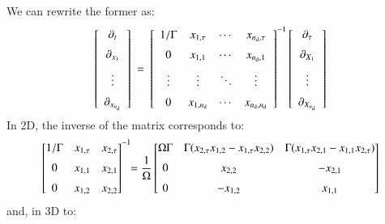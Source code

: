 \documentclass{warpdoc}
\newcommand{\alb}{\vspace{0.2cm}\\} %
\newcommand{\nd}{{{n}_{\rm d}}}
\begin{document}
%
We can rewrite the former as:
%
\begin{equation}
  \left[
    \begin{array}{c}
       \partial_t \alb
       \partial_{x_1} \alb
       \vdots \alb
       \partial_{x_\nd}
    \end{array}
  \right]
  ~=~
  \left[
    \begin{array}{cccc}
       1/\Gamma & x_{1,\tau} & \cdots & x_{\nd,\tau} \alb
       0        & x_{1,1}    & \cdots & x_{\nd,1} \alb
       \vdots   & \vdots     & \ddots & \vdots \alb
       0        & x_{1,\nd} & \cdots & x_{\nd,\nd}
    \end{array}
  \right]^{-1}
  \left[
    \begin{array}{c}
       \partial_\tau \alb
       \partial_{X_1} \alb
       \vdots \alb
       \partial_{X_\nd}
    \end{array}
  \right]
  \label{eqn:chainrule-inv}
\end{equation}
%
In 2D, the inverse of the matrix corresponds to:
%
\begin{equation}
  \label{eqn:chainrule-inv-2D}
  \left[
    \begin{array}{@{}ccc@{}}
       1/\Gamma & x_{1,\tau} & x_{2,\tau} \alb
       0        & x_{1,1}    & x_{2,1} \alb
       0        & x_{1,2}    & x_{2,2}
    \end{array}
  \right]^{-1}
  \!\! =\frac{1}{\Omega}
  \left[
    \begin{array}{@{}ccc@{}}
       \Omega\Gamma & \Gamma (x_{2,\tau}x_{1,2}-x_{1,\tau}x_{2,2}) & \Gamma (x_{1,\tau}x_{2,1} - x_{1,1}x_{2,\tau}) \alb
       0        & x_{2,2}    & -x_{2,1} \alb
       0        & -x_{1,2}    & x_{1,1}
    \end{array}
  \right]
\end{equation}
%
and, in 3D to:
%
\end{document}
